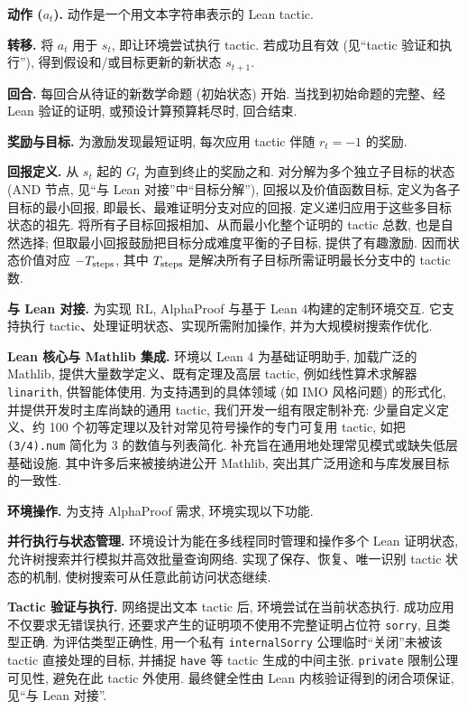 \noindent\textbf{动作 ($a_t$).} 动作是一个用文本字符串表示的 Lean tactic.

\noindent\textbf{转移.} 将 $a_t$ 用于 $s_t$, 即让环境尝试执行 tactic. 若成功且有效 (见“tactic 验证和执行”), 得到假设和/或目标更新的新状态 $s_{t+1}$.

\noindent\textbf{回合.} 每回合从待证的新数学命题 (初始状态) 开始. 当找到初始命题的完整、经 Lean 验证的证明, 或预设计算预算耗尽时, 回合结束.

\noindent\textbf{奖励与目标.} 为激励发现最短证明, 每次应用 tactic 伴随 $r_t=-1$ 的奖励.

\noindent\textbf{回报定义.} 从 $s_t$ 起的 $G_t$ 为直到终止的奖励之和. 对分解为多个独立子目标的状态 (AND 节点, 见“与 Lean 对接”中“目标分解”), 回报以及价值函数目标, 定义为各子目标的最小回报, 即最长、最难证明分支对应的回报. 定义递归应用于这些多目标状态的祖先. 将所有子目标回报相加、从而最小化整个证明的 tactic 总数, 也是自然选择; 但取最小回报鼓励把目标分成难度平衡的子目标, 提供了有趣激励. 因而状态价值对应 $-T_{\rm steps}$, 其中 $T_{\rm steps}$ 是解决所有子目标所需证明最长分支中的 tactic 数.

\noindent\textbf{与 Lean 对接.} 为实现 RL, AlphaProof 与基于 Lean 4\cite{alphaproof-ref1}构建的定制环境交互. 它支持执行 tactic、处理证明状态、实现所需附加操作, 并为大规模树搜索作优化.

\noindent\textbf{Lean 核心与 Mathlib 集成.} 环境以 Lean 4 为基础证明助手, 加载广泛的 Mathlib\cite{alphaproof-ref4}, 提供大量数学定义、既有定理及高层 tactic, 例如线性算术求解器 \texttt{linarith}, 供智能体使用. 为支持遇到的具体领域 (如 IMO 风格问题) 的形式化, 并提供开发时主库尚缺的通用 tactic, 我们开发一组有限定制补充: 少量自定义定义、约 100 个初等定理以及针对常见符号操作的专门可复用 tactic, 如把 \texttt{(3/4).num} 简化为 3 的数值与列表简化. 补充旨在通用地处理常见模式或缺失低层基础设施. 其中许多后来被接纳进公开 Mathlib, 突出其广泛用途和与库发展目标的一致性.

\noindent\textbf{环境操作.} 为支持 AlphaProof 需求, 环境实现以下功能.

\noindent\textbf{并行执行与状态管理.} 环境设计为能在多线程同时管理和操作多个 Lean 证明状态, 允许树搜索并行模拟并高效批量查询网络. 实现了保存、恢复、唯一识别 tactic 状态的机制, 使树搜索可从任意此前访问状态继续.

\noindent\textbf{Tactic 验证与执行.} 网络提出文本 tactic 后, 环境尝试在当前状态执行. 成功应用不仅要求无错误执行, 还要求产生的证明项不使用不完整证明占位符 \texttt{sorry}, 且类型正确. 为评估类型正确性, 用一个私有 \texttt{internalSorry} 公理临时“关闭”未被该 tactic 直接处理的目标, 并捕捉 \texttt{have} 等 tactic 生成的中间主张. \texttt{private} 限制公理可见性, 避免在此 tactic 外使用. 最终健全性由 Lean 内核验证得到的闭合项保证, 见“与 Lean 对接”.

